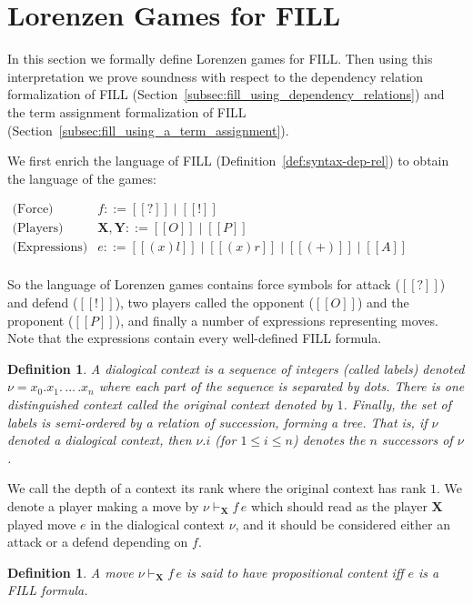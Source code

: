 \documentclass{article}
\newtheorem{definition}[theorem]{Definition}
\begin{document}
\section{Lorenzen Games for FILL}
\label{sec:lorenzen_games_for_fill}

In this section we formally define Lorenzen games for FILL.  Then
using this interpretation we prove soundness with respect to the
dependency relation formalization of FILL
(Section~\ref{subsec:fill_using_dependency_relations}) and the term
assignment formalization of FILL
(Section~\ref{subsec:fill_using_a_term_assignment}).

We first enrich the language of FILL
(Definition~\ref{def:syntax-dep-rel}) to obtain the language of the
games:
\newcommand{\player}[1]{\textbf{#1}}

\begin{center}
  \begin{math}
    \begin{array}{lll}
      \text{(Force)}   & f ::= [[?]] \mid [[!]]\\
      \text{(Players)} & \player{X},\player{Y} ::= [[O]] \mid [[P]]\\
      \text{(Expressions)} & e ::= [[(x)l]] \mid [[(x)r]] \mid [[(+)]] \mid [[A]]\\
    \end{array}
  \end{math}
\end{center}
So the language of Lorenzen games contains force symbols for attack
($[[?]]$) and defend ($[[!]]$), two players called the opponent
($[[O]]$) and the proponent ($[[P]]$), and finally a number of
expressions representing moves.  Note that the expressions contain
every well-defined FILL formula. 

\begin{definition}
  \label{def:dialogical-context}
  A \emph{dialogical context} is a sequence of integers (called
  labels) denoted $\nu = x_0.x_1.\,\ldots\,.x_n$ where each part of
  the sequence is separated by dots.  There is one distinguished
  context called the original context denoted by $1$.  Finally, the
  set of labels is semi-ordered by a relation of succession, forming a
  tree.  That is, if $\nu$ denoted a dialogical context, then $\nu.i$
  (for $1 \leq i \leq n$) denotes the $n$ successors of $\nu$.
\end{definition}
We call the depth of a context its rank where the original context has
rank $1$. We denote a player making a move by
$\nu \vdash_\player{X} f\,e$ which should read as the player
$\player{X}$ played move $e$ in the dialogical context $\nu$, and it
should be considered either an attack or a defend depending on $f$.
\begin{definition}
  \label{def:propositional-content}
  A move $\nu \vdash_\player{X} f\,e$ is said to have
  \emph{propositional content} iff $e$ is a FILL formula.
\end{definition}
\end{document}
